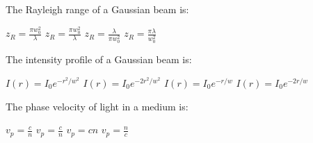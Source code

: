 \begin{question}[2]
The Rayleigh range of a Gaussian beam is:

\begin{oneparcheckboxes}
\choice $\displaystyle z_R = \frac{\pi w_0^2}{\lambda}$
\correctchoice $\displaystyle z_R = \frac{\pi w_0^2}{\lambda}$
\choice $\displaystyle z_R = \frac{\lambda}{\pi w_0^2}$
\choice $\displaystyle z_R = \frac{\pi\lambda}{w_0^2}$
\end{oneparcheckboxes}
\end{question}

\begin{question}[2]
The intensity profile of a Gaussian beam is:

\begin{oneparcheckboxes}
\choice $\displaystyle I(r) = I_0 e^{-r^2/w^2}$
\correctchoice $\displaystyle I(r) = I_0 e^{-2r^2/w^2}$
\choice $\displaystyle I(r) = I_0 e^{-r/w}$
\choice $\displaystyle I(r) = I_0 e^{-2r/w}$
\end{oneparcheckboxes}
\end{question}

\begin{question}[2]
The phase velocity of light in a medium is:

\begin{oneparcheckboxes}
\choice $\displaystyle v_p = \frac{c}{n}$
\correctchoice $\displaystyle v_p = \frac{c}{n}$
\choice $\displaystyle v_p = cn$
\choice $\displaystyle v_p = \frac{n}{c}$
\end{oneparcheckboxes}
\end{question} 